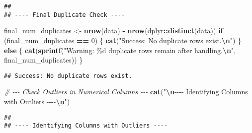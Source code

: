\documentclass[
]{article}
\newenvironment{Shaded}{\begin{snugshade}}{\end{snugshade}}
\newcommand{\CommentTok}[1]{\textcolor[rgb]{0.56,0.35,0.01}{\textit{#1}}}
\newcommand{\ControlFlowTok}[1]{\textcolor[rgb]{0.13,0.29,0.53}{\textbf{#1}}}
\newcommand{\DecValTok}[1]{\textcolor[rgb]{0.00,0.00,0.81}{#1}}
\newcommand{\FunctionTok}[1]{\textcolor[rgb]{0.13,0.29,0.53}{\textbf{#1}}}
\newcommand{\NormalTok}[1]{#1}
\newcommand{\OtherTok}[1]{\textcolor[rgb]{0.56,0.35,0.01}{#1}}
\newcommand{\SpecialCharTok}[1]{\textcolor[rgb]{0.81,0.36,0.00}{\textbf{#1}}}
\newcommand{\StringTok}[1]{\textcolor[rgb]{0.31,0.60,0.02}{#1}}
\begin{document}
\begin{verbatim}
## 
## ---- Final Duplicate Check ----
\end{verbatim}

\begin{Shaded}
\begin{Highlighting}[]
\NormalTok{final\_num\_duplicates }\OtherTok{\textless{}{-}} \FunctionTok{nrow}\NormalTok{(data) }\SpecialCharTok{{-}} \FunctionTok{nrow}\NormalTok{(dplyr}\SpecialCharTok{::}\FunctionTok{distinct}\NormalTok{(data))}
\ControlFlowTok{if}\NormalTok{ (final\_num\_duplicates }\SpecialCharTok{==} \DecValTok{0}\NormalTok{) \{}
  \FunctionTok{cat}\NormalTok{(}\StringTok{"Success: No duplicate rows exist.}\SpecialCharTok{\textbackslash{}n}\StringTok{"}\NormalTok{)}
\NormalTok{\} }\ControlFlowTok{else}\NormalTok{ \{}
  \FunctionTok{cat}\NormalTok{(}\FunctionTok{sprintf}\NormalTok{(}\StringTok{"Warning: \%d duplicate rows remain after handling.}\SpecialCharTok{\textbackslash{}n}\StringTok{"}\NormalTok{, final\_num\_duplicates))}
\NormalTok{\}}
\end{Highlighting}
\end{Shaded}

\begin{verbatim}
## Success: No duplicate rows exist.
\end{verbatim}

\begin{Shaded}
\begin{Highlighting}[]
\CommentTok{\# {-}{-}{-} Check Outliers in Numerical Columns {-}{-}{-}}
\FunctionTok{cat}\NormalTok{(}\StringTok{"}\SpecialCharTok{\textbackslash{}n}\StringTok{{-}{-}{-}{-} Identifying Columns with Outliers {-}{-}{-}{-}}\SpecialCharTok{\textbackslash{}n}\StringTok{"}\NormalTok{)}
\end{Highlighting}
\end{Shaded}

\begin{verbatim}
## 
## ---- Identifying Columns with Outliers ----
\end{verbatim}
\end{document}

